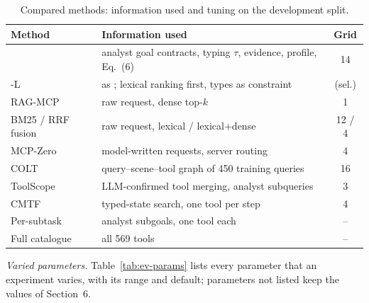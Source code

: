 \begin{table}[t]
\centering
\caption{Compared methods: information used and tuning on the development split.}
\label{tab:ev-methods}
\scriptsize
\setlength{\tabcolsep}{2.5pt}
\begin{tabular}{@{}lp{3.95cm}c@{}}
\toprule
Method & Information used & Grid \\
\midrule
\pamcp{} & analyst goal contracts, typing $\tau$, evidence, profile, Eq.~(6) & 14 \\
\pamcp{}-L & as \pamcp{}; lexical ranking first, types as constraint & (sel.) \\
RAG-MCP \cite{gan2025ragmcp} & raw request, dense top-$k$ & 1 \\
BM25 / RRF fusion & raw request, lexical / lexical+dense & 12 / 4 \\
MCP-Zero \cite{fei2025mcpzero} & model-written requests, server routing & 4 \\
COLT \cite{qu2024colt} & query--scene--tool graph of 450 training queries & 16 \\
ToolScope \cite{liu2026toolscope} & LLM-confirmed tool merging, analyst subqueries & 3 \\
CMTF \cite{suresh2026cmtf} & typed-state search, one tool per step & 4 \\
Per-subtask & analyst subgoals, one tool each & -- \\
Full catalogue & all 569 tools & -- \\
\bottomrule
\end{tabular}
\end{table}

\emph{Varied parameters.} Table~\ref{tab:ev-params} lists every parameter that an experiment varies, with its
range and default; parameters not listed keep the values of Section~6.

